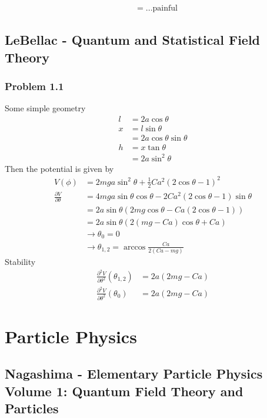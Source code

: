 \documentclass[10pt,a4paper]{book}
\theoremstyle{definition}
\begin{document}
\begin{align}
[M_{\mu\nu},M_{\rho,\sigma}]
&=...\text{painful}
\end{align}

\section{{\sc LeBellac} - Quantum and Statistical Field Theory}
\subsection{Problem 1.1}
Some simple geometry
\begin{align}
l&=2a\cos\theta\\
x&=l\sin\theta\\
&=2a\cos\theta\sin\theta\\
h&=x\tan\theta\\
&=2a\sin^2\theta
\end{align}
Then the potential is given by
\begin{align}
V(\phi)
&=2mga\sin^2\theta+\frac{1}{2}Ca^2(2\cos\theta-1)^2\\
\frac{\partial V}{\partial\theta}
&=4mga\sin\theta\cos\theta-2Ca^2(2\cos\theta-1)\sin\theta\\
&=2a\sin\theta\left(2mg\cos\theta-Ca(2\cos\theta-1)\right)\\
&=2a\sin\theta\left(2(mg-Ca)\cos\theta+Ca\right)\\
&\rightarrow\theta_0=0\\
&\rightarrow\theta_{1,2}=\arccos\frac{Ca}{2(Ca-mg)}
\end{align}
Stability
\begin{align}
\frac{\partial^2 V}{\partial\theta^2}(\theta_{1,2})
&=2a(2mg-Ca)\\
\frac{\partial^2 V}{\partial\theta^2}(\theta_{0})
&=2a(2mg-Ca)
\end{align}

\newpage
\chapter{Particle Physics}
\section{{\sc Nagashima} - Elementary Particle Physics Volume 1: Quantum Field Theory and Particles}
\end{document}
